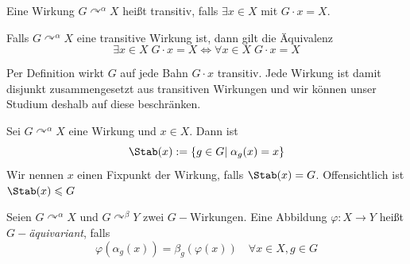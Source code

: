 \documentclass[11pt, a4paper]{article}
\begin{document}
\begin{definition}
Eine Wirkung  $G \curvearrowright^\alpha X$ heißt transitiv, falls $\exists x \in X$ mit $G\cdot x = X$.
\end{definition}

\begin{note}\label{Äquivalenz-Transitivität}
    Falls $G \curvearrowright^\alpha X$ eine transitive Wirkung ist, dann gilt die Äquivalenz
    $$\exists x\in X\; G\cdot x = X \Longleftrightarrow \forall x\in X \; G\cdot x = X$$
\end{note}

\begin{note} Per Definition wirkt $G$ auf jede Bahn $G\cdot x$ transitiv. Jede Wirkung ist damit disjunkt zusammengesetzt aus transitiven Wirkungen und wir können unser Studium deshalb auf diese beschränken.
\end{note}

\begin{definition} Sei  $G \curvearrowright^\alpha X$ eine Wirkung und $x\in X$. Dann ist
$$\Stab(x):= \{g\in G|\; \alpha_g(x) = x\}$$
Wir nennen $x$ einen Fixpunkt der Wirkung, falls $\Stab(x) = G$. Offensichtlich ist $\Stab(x)\leqslant G$
\end{definition}

\begin{definition}[G-Äquivarianz] Seien  $G \curvearrowright^\alpha X$ und  $G \curvearrowright^\beta Y$ zwei $G-$Wirkungen. Eine Abbildung $\varphi: X\to Y$ heißt \emph{$G-$äquivariant}, falls 
$$\varphi(\alpha_g(x)) = \beta_g(\varphi(x)) \quad \forall x\in X, g\in G$$
    
\end{definition}
\end{document}
